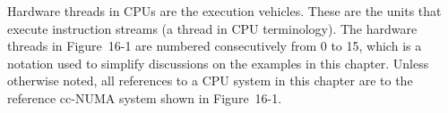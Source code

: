 Hardware threads in CPUs are the execution vehicles. These are the units that execute instruction streams (a thread in CPU terminology). The hardware threads in Figure 16-1 are numbered consecutively from 0 to 15, which is a notation used to simplify discussions on the examples in this chapter. Unless otherwise noted, all references to a CPU system in this chapter are to the reference cc-NUMA system shown in Figure 16-1.\par




























































